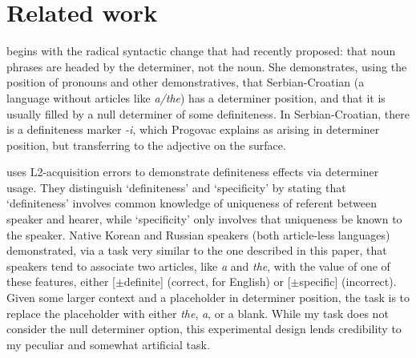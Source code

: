 \documentclass[11pt]{article}\usepackage{graphicx, color}
\begin{document}





\section{Related work}

\citet{progovac:1995} begins with the radical syntactic change that \citet{abney:1987} had recently proposed: that noun phrases are headed by the determiner, not the noun. She demonstrates, using the position of pronouns and other demonstratives, that Serbian-Croatian (a language without articles like \emph{a/the}) has a determiner position, and that it is usually filled by a null determiner of some definiteness. In Serbian-Croatian, there is a definiteness marker \emph{-i}, which Progovac explains as arising in determiner position, but transferring to the adjective on the surface.

\citet{ko:2009} uses L2-acquisition errors to demonstrate definiteness effects via determiner usage. They distinguish `definiteness' and `specificity' by stating that `definiteness' involves common knowledge of uniqueness of referent between speaker and hearer, while `specificity' only involves that uniqueness be known to the speaker. Native Korean and Russian speakers (both article-less languages) demonstrated, via a task very similar to the one described in this paper, that speakers tend to associate two articles, like \emph{a} and \emph{the}, with the value of one of these features, either [$\pm$definite] (correct, for English) or [$\pm$specific] (incorrect). Given some larger context and a placeholder in determiner position, the task is to replace the placeholder with either \emph{the}, \emph{a}, or a blank. While my task does not consider the null determiner option, this experimental design lends credibility to my peculiar and somewhat artificial task.
\end{document}
